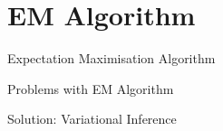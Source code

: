 \section*{EM Algorithm}
\begin{frame}{Expectation Maximisation Algorithm}

\end{frame}

\begin{frame}{Problems with EM Algorithm}
    
\end{frame}

\begin{frame}{Solution: Variational Inference}

\end{frame}

